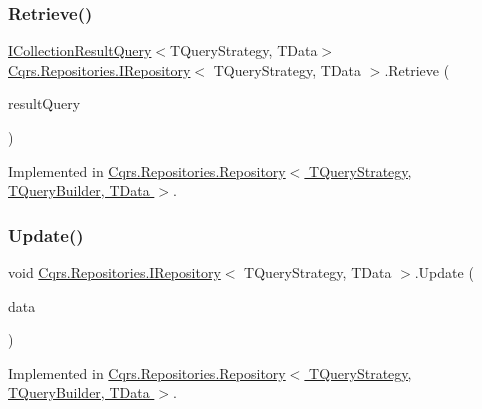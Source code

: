 \mbox{\label{interfaceCqrs_1_1Repositories_1_1IRepository_a0faeb50aa395d63ccd81e66906360e81}} 
\subsubsection{\texorpdfstring{Retrieve()}{Retrieve()}\hspace{0.1cm}{\footnotesize\ttfamily [2/2]}}
{\footnotesize\ttfamily \hyperlink{interfaceCqrs_1_1Repositories_1_1Queries_1_1ICollectionResultQuery}{I\+Collection\+Result\+Query}$<$T\+Query\+Strategy, T\+Data$>$ \hyperlink{interfaceCqrs_1_1Repositories_1_1IRepository}{Cqrs.\+Repositories.\+I\+Repository}$<$ T\+Query\+Strategy, T\+Data $>$.Retrieve (\begin{DoxyParamCaption}\item[{\hyperlink{interfaceCqrs_1_1Repositories_1_1Queries_1_1ICollectionResultQuery}{I\+Collection\+Result\+Query}$<$ T\+Query\+Strategy, T\+Data $>$}]{result\+Query }\end{DoxyParamCaption})}



Implemented in \hyperlink{classCqrs_1_1Repositories_1_1Repository_ab1136a454f981848d49e0d0a2f4b6a2f}{Cqrs.\+Repositories.\+Repository$<$ T\+Query\+Strategy, T\+Query\+Builder, T\+Data $>$}.

\mbox{\label{interfaceCqrs_1_1Repositories_1_1IRepository_af8a0b1cf5eedd7653d2867ab38657d46}} 
\subsubsection{\texorpdfstring{Update()}{Update()}}
{\footnotesize\ttfamily void \hyperlink{interfaceCqrs_1_1Repositories_1_1IRepository}{Cqrs.\+Repositories.\+I\+Repository}$<$ T\+Query\+Strategy, T\+Data $>$.Update (\begin{DoxyParamCaption}\item[{T\+Data}]{data }\end{DoxyParamCaption})}



Implemented in \hyperlink{classCqrs_1_1Repositories_1_1Repository_a893276506e64034992d2c29d5ef11100}{Cqrs.\+Repositories.\+Repository$<$ T\+Query\+Strategy, T\+Query\+Builder, T\+Data $>$}.

